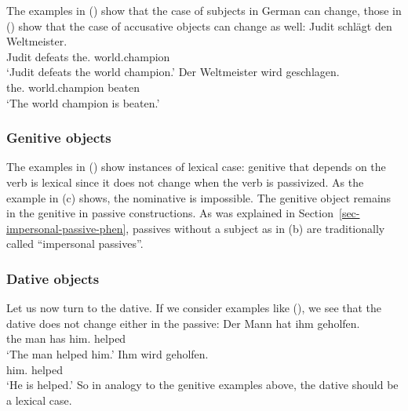 The examples in () show that the case of subjects in German can change, those in ()
show that the case of accusative objects can change as well:
\eal
\ex 
\gll Judit schlägt den Weltmeister.\\
     Judit defeats the.\ACC{} world.champion\\
\glt `Judit defeats the world champion.'
\ex 
\gll Der        Weltmeister    wird   geschlagen.\\
     the.\NOM{} world.champion \AUX{} beaten\\
\glt `The world champion is beaten.'
\zl

\subsubsection{Genitive objects}

The examples in () show instances of lexical case: genitive that depends on the verb is
lexical since it does not change when the verb is passivized.
\eal
{}
\zl
As the example in (c) shows, the nominative is impossible. The genitive object remains in the
genitive in passive constructions. As was explained in Section~\ref{sec-impersonal-passive-phen},
passives without a subject as in (b) are traditionally called ``impersonal passives''.

\subsubsection{Dative objects}
\label{sec-dative-objects-tructurl-lexical}

Let us now turn to the dative. If we consider examples like (), we see that the dative does not
change either in the passive:
\eal
\ex 
\gll Der Mann hat ihm geholfen.\\
     the\NOM{} man  has him.\DAT{} helped\\
\glt `The man helped him.'
\ex 
\gll Ihm        wird geholfen.\\
     him.\DAT{} \AUX{} helped\\
\glt `He is helped.'
\zl
So in analogy to the genitive examples above, the dative should be a lexical case.

